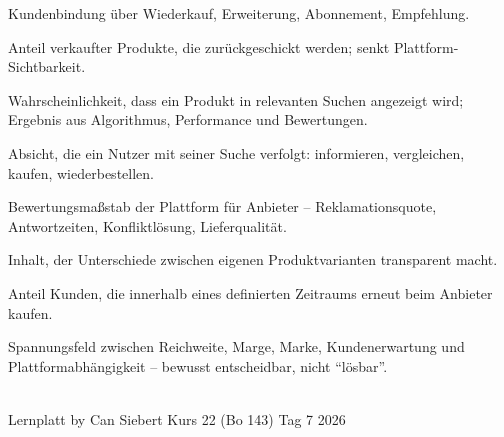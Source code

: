 \documentclass[11pt,a4paper,oneside]{article}
\begin{document}
\begin{description}[style=nextline,leftmargin=0pt,labelindent=0pt,itemsep=4pt]
  \item[Retention] Kundenbindung über Wiederkauf, Erweiterung, Abonnement, Empfehlung.
  \item[Retourenquote] Anteil verkaufter Produkte, die zurückgeschickt werden; senkt Plattform-Sichtbarkeit.
  \item[Sichtbarkeit] Wahrscheinlichkeit, dass ein Produkt in relevanten Suchen angezeigt wird; Ergebnis aus Algorithmus, Performance und Bewertungen.
  \item[Suchintention] Absicht, die ein Nutzer mit seiner Suche verfolgt: informieren, vergleichen, kaufen, wiederbestellen.
  \item[Verkäuferperformance] Bewertungsmaßstab der Plattform für Anbieter -- Reklamationsquote, Antwortzeiten, Konfliktlösung, Lieferqualität.
  \item[Vergleichstabelle] Inhalt, der Unterschiede zwischen eigenen Produktvarianten transparent macht.
  \item[Wiederkaufrate] Anteil Kunden, die innerhalb eines definierten Zeitraums erneut beim Anbieter kaufen.
  \item[Zielkonflikt (Plattform-Verkauf)] Spannungsfeld zwischen Reichweite, Marge, Marke, Kundenerwartung und Plattform­abhängigkeit -- bewusst entscheidbar, nicht ``lösbar''.
\end{description}

\vspace{1cm}
\noindent{\color{lpAccent}\rule{\linewidth}{0.6pt}}\\[4pt]
{\footnotesize\sffamily\color{lpGray}Lernplatt \textperiodcentered{} by Can Siebert \textperiodcentered{} Kurs 22 (Bo 143) \textperiodcentered{} Tag 7 \textperiodcentered{} \textcopyright{} 2026}
\end{document}
